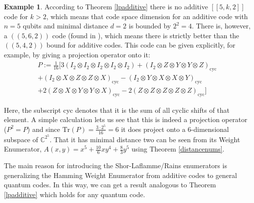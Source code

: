 \documentclass[12pt,a4paper,BCOR15mm,twoside,DIV12]{article}
\def\C{\mathbb{C}}
\def\Tr{\text{Tr}}
\theoremstyle{definition}
\newtheorem{ex}[Satz]{Example}
\begin{document}
\begin{ex}\label{nonadditivecode}
According to Theorem \ref{lpadditive} there is no additive $[[5,k,2]]$ code for $k > 2$, which means that 
code space dimension for an additive code with $n=5$ qubits and minimal distance $d=2$ is bounded by $2^2 = 4$.
There is, however, a $((5,6,2))$ code (found in \cite{nonadditive}), which means there is strictly better than the $((5,4,2))$ bound for additive codes. 
This code can be given explicitly, for example, by giving a projection operator onto it:
\begin{align*}
  P:= \frac{1}{16} [ 3 (I_2 \otimes I_2 \otimes I_2 \otimes I_2 \otimes I_2) + (I_2 \otimes Z \otimes Y \otimes Y \otimes Z)_\text{cyc} \\ 
+  (I_2 \otimes X \otimes Z \otimes Z \otimes X)_\text{cyc} -  (I_2 \otimes Y \otimes X \otimes X \otimes Y)_\text{cyc} \\
 + 2  (Z \otimes X \otimes Y \otimes Y \otimes X)_\text{cyc} - 2 (Z \otimes Z \otimes Z \otimes Z \otimes Z)_\text{cyc}]
\end{align*}

Here, the subscript cyc denotes that it is the sum of all cyclic shifts of that element. A simple calculation lets us see that this is indeed a projection operator ($P^2 = P$) and since $\Tr(P) = \frac{3 \cdot 2^5}{16} = 6$ it does project onto a $6$-dimensional subspace of $\C^{2^5}$.
That it has minimal distance two can be seen from its Weight Enumerator, $A(x,y) =  x^5 + \frac{10}{6} xy^4 + \frac{8}{3} y^5$ using Theorem \ref{distancenums}.
\end{ex}

The main reason for introducing the Shor-Laflamme/Rains enumerators is generalizing the Hamming Weight Enumerator from additive codes to general quantum codes. In this way, we can get a result analogous to Theorem \ref{lpadditive} which holds for any quantum code. 
\end{document}

